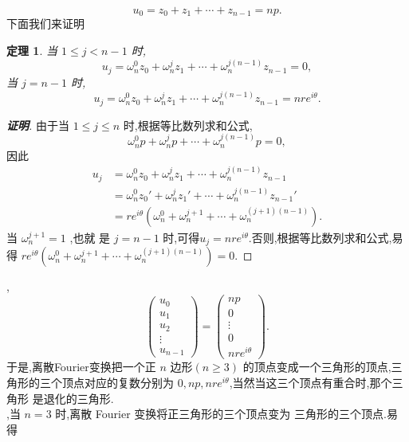 \documentclass[a4paper]{article}
\newtheorem{theorem}{定理}
\begin{document}
$$
u_0=z_0+z_1+\cdots+z_{n-1}=np.
$$
下面我们来证明
\begin{theorem}
  当 $1\leq j<n-1$ 时,
$$
u_j=\omega_n^0z_0+\omega_n^jz_1+\cdots+\omega_n^{j(n-1)}z_{n-1}=0,
$$
当 $j=n-1$ 时,
$$
u_j=\omega_n^0z_0+\omega_n^jz_1+\cdots+\omega_n^{j(n-1)}z_{n-1}=nre^{i\theta}.
$$
\end{theorem}
\begin{proof}[\textbf{证明}]
  由于当 $1\leq j\leq n$ 时,根据等比数列求和公式,
$$
\omega_n^0p+\omega_n^jp+\cdots+\omega_n^{j(n-1)}p=0,
$$
因此
\begin{align*}
  u_j&=\omega_n^0z_0+\omega_n^jz_1+\cdots+\omega_n^{j(n-1)}z_{n-1}\\&=\omega_{n}^{0}z_{0}'+\omega_{n}^{j}z_{1}'+\cdots+\omega_{n}^{j(n-1)}z_{n-1}'\\&=re^{i\theta}(\omega_{n}^0+\omega_{n}^{j+1}+\cdots+\omega_{n}^{(j+1)(n-1)}).
\end{align*}
当 $\omega_n^{j+1}=1$ ,也就
是 $j=n-1$ 时,可得$u_j=nre^{i\theta}.$否则,根据等比数列求和公式,易
得
$re^{i\theta}(\omega_n^0+\omega_{n}^{j+1}+\cdots+\omega_n^{(j+1)(n-1)})=0$.
\end{proof}
\bigskip
{},
$$
\begin{pmatrix}
  u_0\\
  u_1\\
u_2\\
  \vdots\\
  u_{n-1}
\end{pmatrix}=\begin{pmatrix}
  np\\
  0\\
  \vdots\\
  0\\
  nre^{i\theta}
\end{pmatrix}.
$$
于是,离散Fourier变换把一个正 $n$ 边形$(n\geq
3)$ 的顶点变成一个三角形的顶点,三角形的三个顶点对应的复数分别为
$0,np,nre^{i\theta}$,当然当这三个顶点有重合时,那个三角形
是退化的三角形.\\

,当 $n=3$ 时,离散 Fourier 变换将正三角形的三个顶点变为
三角形的三个顶点.易得
\end{document}
